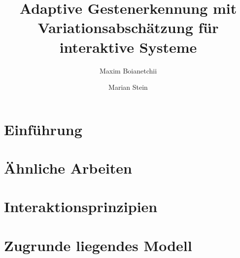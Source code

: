 \documentclass{llncs}
\begin{document}
\pagestyle{headings}

\mainmatter

\title{Adaptive Gestenerkennung mit Variationsabschätzung für interaktive Systeme}


\author{Maxim Boianetchii \and Marian Stein}



\maketitle
\section{Einführung}


\section{Ähnliche Arbeiten}


\section{Interaktionsprinzipien}


\section{Zugrunde liegendes Modell}
\end{document}
